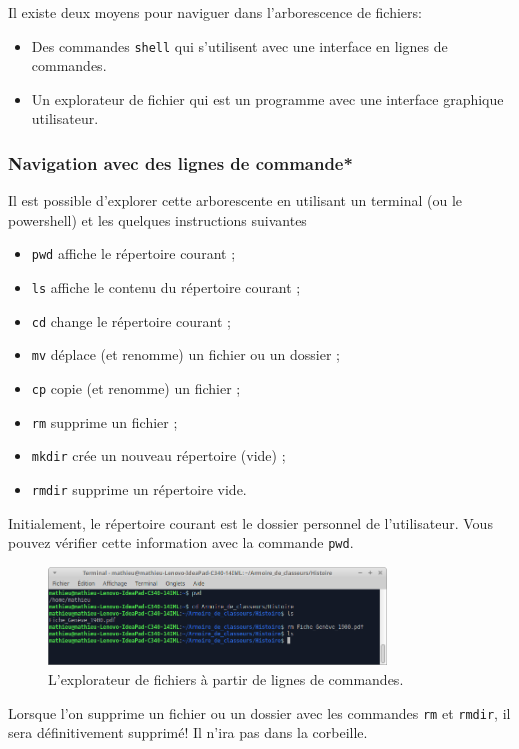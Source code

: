 Il existe deux moyens pour naviguer dans l'arborescence de fichiers:
\begin{itemize}
	\item Des commandes \lstinline{shell} qui s'utilisent avec une interface en lignes de commandes.
	\item Un explorateur de fichier qui est un programme avec une interface graphique utilisateur.
\end{itemize}

\subsubsection{Navigation avec des lignes de commande*}
Il est possible d’explorer cette arborescente en utilisant un terminal (ou le powershell) et les quelques instructions suivantes
\begin{itemize}
	\item \lstinline{pwd} affiche le répertoire courant ;
	\item \lstinline{ls} affiche le contenu du répertoire courant ;
	\item \lstinline{cd} change le répertoire courant ;
	\item \lstinline{mv} déplace (et renomme) un fichier ou un dossier ;
	\item \lstinline{cp} copie (et renomme) un fichier ;
	\item \lstinline{rm} supprime un fichier ;
	\item \lstinline{mkdir} crée un nouveau répertoire (vide) ;
	\item \lstinline{rmdir} supprime un répertoire vide.
\end{itemize}

 Initialement, le répertoire courant est le dossier personnel de l'utilisateur. Vous pouvez vérifier cette information avec la commande \lstinline{pwd}.
\begin{figure}[h!]
	\centering
	\includegraphics[trim=0 0 0 0,width=0.8\textwidth]{Images/OS/navigation_terminal}
	\caption{L'explorateur de fichiers à partir de lignes de commandes.}
\end{figure}
\begin{important}
	Lorsque l'on supprime un fichier ou un dossier avec les commandes \lstinline{rm} et \lstinline{rmdir}, il sera définitivement supprimé! Il n'ira pas dans la corbeille.
\end{important}	

